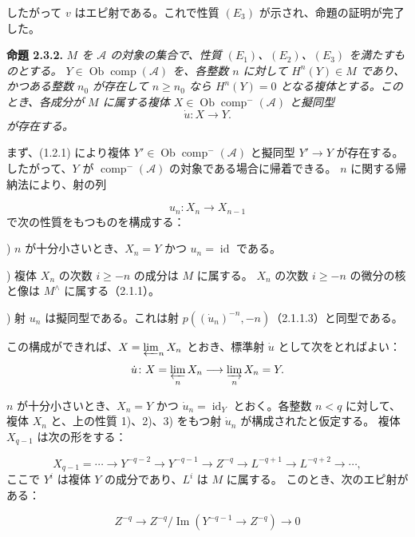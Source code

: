 \clearpage
{}%
\begingroup\small\setlength{\parskip}{0pt}\setlength{\emergencystretch}{1.5em}
\setlength{\abovedisplayskip}{4pt plus 2pt minus 2pt}%
\setlength{\belowdisplayskip}{4pt plus 2pt minus 2pt}%

したがって $v$ はエピ射である。これで性質 $(E_3)$ が示され、命題の証明が完了した。

\medskip\noindent\textbf{命題 2.3.2.}
\textit{$M$ を $\mathcal A$ の対象の集合で、性質
$(E_1)$、$(E_2)$、$(E_3)$ を満たすものとする。
$Y\in\operatorname{Ob}\operatorname{comp}(\mathcal A)$ を、各整数 $n$ に対して
$H^n(Y)\in M$ であり、かつある整数 $n_0$ が存在して
$n\geq n_0$ なら $H^n(Y)=0$ となる複体とする。このとき、各成分が
$M$ に属する複体
$X\in\operatorname{Ob}\operatorname{comp}^{-}(\mathcal A)$ と擬同型}
\[
\dot u\colon X\longrightarrow Y.
\]
\textit{が存在する。}

まず、(1.2.1) により複体
$Y'\in\operatorname{Ob}\operatorname{comp}^{-}(\mathcal A)$ と擬同型
$Y'\longrightarrow Y$ が存在する。したがって、$Y$ が
$\operatorname{comp}^{-}(\mathcal A)$ の対象である場合に帰着できる。
$n$ に関する帰納法により、射の列

\[
u_n\colon X_n\longrightarrow X_{n-1}
\]
で次の性質をもつものを構成する：

) $n$ が十分小さいとき、$X_n=Y$ かつ
$u_n=\operatorname{id}$ である。

) 複体 $X_n$ の次数 $i\geq -n$ の成分は $M$ に属する。
$X_n$ の次数 $i\geq -n$ の微分の核と像は $M^\wedge$ に属する（2.1.1）。

) 射 $u_n$ は擬同型である。これは射
$p((\dot u_n)^{-n},-n)$（2.1.1.3）と同型である。

この構成ができれば、$X=\varprojlim_n X_n$ とおき、標準射
$\dot u$ として次をとればよい：
\[
\dot u\colon X=\varprojlim_n X_n\longrightarrow\varinjlim_n X_n=Y.
\]

$n$ が十分小さいとき、$X_n=Y$ かつ
$\dot u_n=\operatorname{id}_Y$ とおく。各整数 $n<q$ に対して、
複体 $X_n$ と、上の性質 1)、2)、3) をもつ射 $\dot u_n$ が構成されたと仮定する。
複体 $X_{q-1}$ は次の形をする：

\[
X_{q-1}=\cdots\longrightarrow Y^{-q-2}\longrightarrow Y^{-q-1}
\longrightarrow Z^{-q}\longrightarrow L^{-q+1}\longrightarrow L^{-q+2}
\longrightarrow\cdots,
\]
ここで $Y^i$ は複体 $Y$ の成分であり、$L^i$ は $M$ に属する。
このとき、次のエピ射がある：

\[
Z^{-q}\longrightarrow
Z^{-q}/\operatorname{Im}(Y^{-q-1}\longrightarrow Z^{-q})
\longrightarrow0
\]
\endgroup
